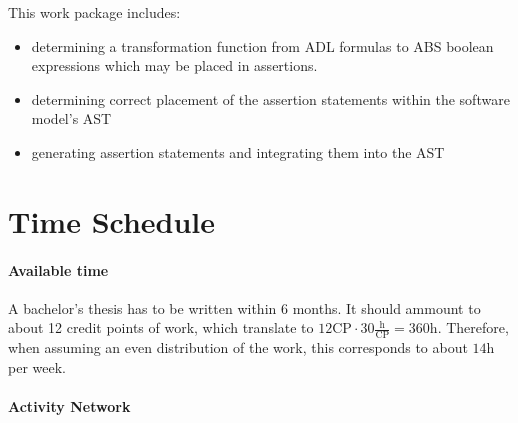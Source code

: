 \documentclass[paper=a4,nochapname,accentcolor=tud9c]{tudexercise}
\begin{document}
\begin{enumdescript}
    This work package includes:
    \begin{itemize}
      \item determining a transformation function from ADL formulas to ABS
        boolean expressions which may be placed in assertions.
      \item determining correct placement of the assertion statements within
        the software model's AST
      \item generating assertion statements and integrating them into the AST
    \end{itemize}
\end{enumdescript}

\section{Time Schedule}

\paragraph{Available time}
%
A bachelor's thesis has to be written within 6 months.
It should ammount to about 12 credit points of work, which translate to $12 \mathrm{CP} \cdot 30 \frac{\mathrm{h}}{\mathrm{CP}} = 360 \mathrm{h}$.
Therefore, when assuming an even distribution of the work, this corresponds to about $14 \mathrm{h}$ per week.

\paragraph{Activity Network}
\end{document}
